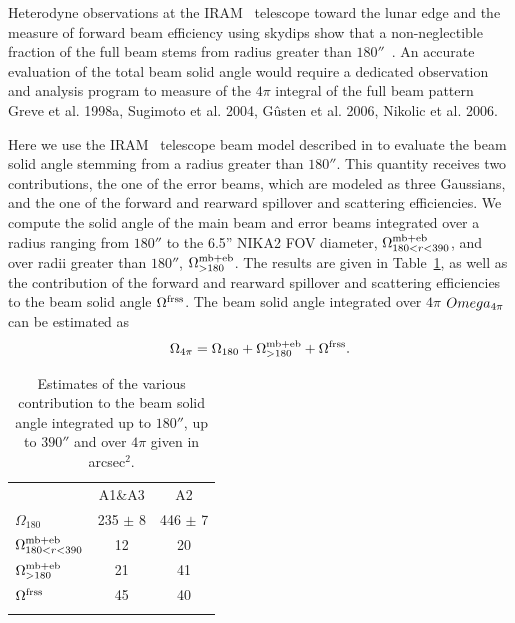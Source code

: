 Heterodyne observations at the IRAM \trentemetre\ telescope
toward the lunar edge and the measure of forward beam efficiency using
skydips show that a non-neglectible fraction of the full beam stems
from radius greater than $180''$~\citep{Greve2010, Kramer2013}.
An accurate evaluation of the total beam solid angle would require a
dedicated observation {\lp and analysis} program to measure of the $4\pi$ integral of the
full beam pattern {\lp Greve et al. 1998a, Sugimoto et al. 2004,
G\^usten et al. 2006, Nikolic et al. 2006.}
{\lp Here we use the IRAM \trentemetre\ telescope beam model described
in \citet{Kramer2013} to evaluate the beam solid angle stemming from a
radius greater than $180''$.
This quantity receives two contributions, the one of the error beams,
which are modeled as three Gaussians, and the one of the forward and
rearward spillover and scattering efficiencies. We compute the solid
angle of the main beam and error beams integrated over a radius ranging
from $180''$ to the 6.5'' NIKA2 FOV diameter,
$\Omega_{180<r<390}^{\rm{mb+eb}}$, and over radii greater
than $180''$, $\Omega_{>180}^{\rm{mb+eb}}$. The results are given in
Table~\ref{tab:solid_corr}, as well as the contribution of the forward and
rearward spillover and scattering efficiencies to the beam solid angle
$\Omega^{\rm{frss}}$. The beam solid angle integrated over $4\pi$
$Omega_{\rm{4\pi}}$ can be estimated as
\begin{equation}
\Omega_{\rm{4\pi}} = \Omega_{180} + \Omega_{>180}^{\rm{mb+eb}}
+ \Omega^{\rm{frss}}.
\label{eq:omega_beam_4pi}
\end{equation}

\begin{table}[!h]
\caption{Estimates of the various contribution to the beam solid angle
integrated up to $180''$, up to $390''$ and over $4\pi$ given in
arcsec$^{2}$. }
\label{tab:solid_corr}
\centering
\begin{tabular}{lcc}
\hline\hline
\noalign{\smallskip}
&  A1\&A3 & A2 \\
\noalign{\smallskip}
\hline
\noalign{\smallskip}
$\Omega_{180}$                  &   235 $\pm$  8 & 446 $\pm$  7 \\
$\Omega_{180<r<390}^{\rm{mb+eb}}$  &   12          &   20       \\
$\Omega_{>180}^{\rm{mb+eb}}$      &   21          &   41      \\
$\Omega^{\rm{frss}}$             &   45          &   40      \\
\noalign{\smallskip}
\hline
\end{tabular}
\end{table}
}


